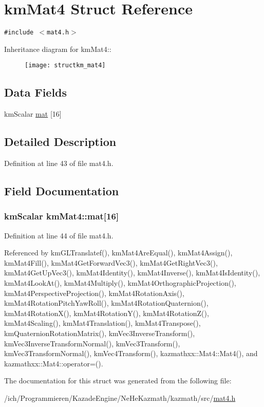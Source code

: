 \hypertarget{structkm_mat4}{
\section{kmMat4 Struct Reference}
\label{structkm_mat4}
}
{\tt \#include $<$mat4.h$>$}

Inheritance diagram for kmMat4::\begin{figure}[H]
\begin{center}
\leavevmode
\texttt{[image: structkm\_mat4]}
\end{center}
\end{figure}
\subsection*{Data Fields}
\begin{CompactItemize}
\item 
kmScalar \hyperlink{structkm_mat4_39a393fbd31604045d69a6af0fa3b34a}{mat} \mbox{[}16\mbox{]}
\end{CompactItemize}


\subsection{Detailed Description}


Definition at line 43 of file mat4.h.

\subsection{Field Documentation}
\hypertarget{structkm_mat4_39a393fbd31604045d69a6af0fa3b34a}{
\subsubsection[mat]{\setlength{\rightskip}{0pt plus 5cm}kmScalar {\bf kmMat4::mat}\mbox{[}16\mbox{]}}}
\label{structkm_mat4_39a393fbd31604045d69a6af0fa3b34a}




Definition at line 44 of file mat4.h.

Referenced by kmGLTranslatef(), kmMat4AreEqual(), kmMat4Assign(), kmMat4Fill(), kmMat4GetForwardVec3(), kmMat4GetRightVec3(), kmMat4GetUpVec3(), kmMat4Identity(), kmMat4Inverse(), kmMat4IsIdentity(), kmMat4LookAt(), kmMat4Multiply(), kmMat4OrthographicProjection(), kmMat4PerspectiveProjection(), kmMat4RotationAxis(), kmMat4RotationPitchYawRoll(), kmMat4RotationQuaternion(), kmMat4RotationX(), kmMat4RotationY(), kmMat4RotationZ(), kmMat4Scaling(), kmMat4Translation(), kmMat4Transpose(), kmQuaternionRotationMatrix(), kmVec3InverseTransform(), kmVec3InverseTransformNormal(), kmVec3Transform(), kmVec3TransformNormal(), kmVec4Transform(), kazmathxx::Mat4::Mat4(), and kazmathxx::Mat4::operator=().

The documentation for this struct was generated from the following file:\begin{CompactItemize}
\item 
/ich/Programmieren/KazadeEngine/NeHeKazmath/kazmath/src/\hyperlink{mat4_8h}{mat4.h}\end{CompactItemize}
